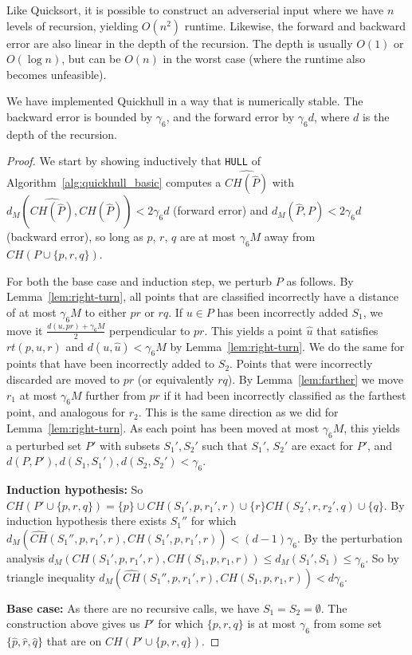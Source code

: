 Like Quicksort, it is possible to construct an adverserial input where we have 
$n$ levels of recursion, yielding $O(n^2)$ runtime. Likewise, the forward
and backward error are also linear in the depth of the recursion.
The depth is usually $O(1)$ or $O(\log n)$, but can be $O(n)$ in the worst 
case (where the runtime also becomes unfeasible).

\begin{theorem}
    We have implemented Quickhull in a way that is numerically stable.
    The backward error is bounded by $\gamma_6$, and the forward error by
    $\gamma_6 d$, where $d$ is the depth of the recursion. 
\end{theorem}

\begin{proof}

    We start by showing inductively that \texttt{HULL} of 
    Algorithm~\ref{alg:quickhull_basic} computes a $\widehat{CH(\hat{P})}$
    with $d_M(\widehat{CH(\hat{P})}, CH(\hat{P})) < 2\gamma_6 d$ (forward error)
    and $d_M(\hat{P}, P) < 2\gamma_6 d$ (backward error), so long as $p$, $r$,
    $q$ are at most $\gamma_6 M$ away from $CH(P \cup \{p, r, q\})$.

    For both the base case and induction step, we perturb $P$ as follows.
    By Lemma~\ref{lem:right-turn}, all points that are classified incorrectly 
    have a distance of at most $\gamma_6 M$ to either $pr$ or $rq$. If 
    $u \in P$ has been incorrectly added $S_1$, we move it 
    $\frac{d(u, pr) + \gamma_6 M}{2}$ perpendicular to $pr$. This yields a 
    point $\hat{u}$ that satisfies $rt(p, u, r)$ and 
    $d(u, \hat{u}) < \gamma_6 M$ by Lemma~\ref{lem:right-turn}. We do the same 
    for points that have been incorrectly added to $S_2$. Points that were 
    incorrectly discarded are moved to $pr$ (or equivalently $rq$). By 
    Lemma~\ref{lem:farther} we move $r_1$ at most $\gamma_6 M$ further from
    $pr$ if it had been incorrectly classified as the farthest point, and 
    analogous for $r_2$. This is the same direction as we did for 
    Lemma~\ref{lem:right-turn}.
    As each point has been moved at most $\gamma_6 M$, this yields a perturbed 
    set $P'$ with subsets $S_1', S_2'$ such that $S_1'$, $S_2'$ are exact for $P'$, 
    and $d(P, P'), d(S_1, S_1'), d(S_2, S_2') < \gamma_6$.

    \textbf{Induction hypothesis:}
    So $CH(P' \cup \{p, r, q\}) = \{p\} \cup CH(S_1', p, r_1', r) \cup \{r\}
        CH(S_2', r, r_2', q) \cup \{q\}$.
    By induction hypothesis there exists $S_1''$ for which
    $d_M(\widehat{CH}(S_1'', p, r_1', r), CH(S_1', p, r_1', r)) < 
    (d - 1) \gamma_6$.
    By the perturbation analysis 
    $d_M(CH(S_1', p, r_1', r), CH(S_1, p, r_1, r)) \leq 
    d_M(S_1', S_1) \leq \gamma_6$.
    So by triangle inequality 
    $d_M(\widehat{CH}(S_1'', p, r_1', r), CH(S_1, p, r_1, r)) < d \gamma_6$.

    \textbf{Base case:}
    As there are no recursive calls, we have 
    $S_1 = S_2 = \emptyset$. The construction above gives us $P'$ for which
    $\{p, r, q\}$ is at most $\gamma_6$ from some set 
    $\{\hat{p}, \hat{r}, \hat{q}\}$ that are on $CH(P' \cup \{p, r, q\})$.
\end{proof}
